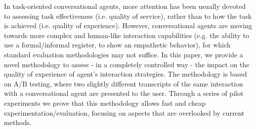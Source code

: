 In task-oriented conversational agents, more attention has been usually devoted to assessing task effectiveness (i.e. quality of service), rather than to how the task is achieved (i.e. quality of experience). However, conversational agents are moving towards more complex and human-like interaction capabilities (e.g. the ability to use a formal/informal register, to show an empathetic behavior), for which standard evaluation methodologies may not suffice. In this paper, we provide a novel methodology to assess - in a completely controlled way - the impact on the quality of experience of agent's interaction strategies. The methodology is based on A/B testing, where two slightly different transcripts of the same interaction with a conversational agent are presented to the user. Through a series of pilot experiments we prove that this methodology allows fast and cheap experimentation/evaluation, focusing on aspects that are overlooked by current methods.
